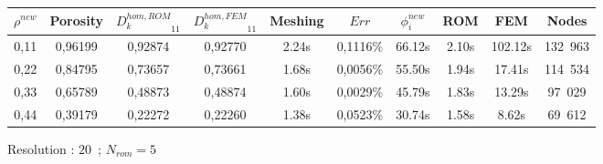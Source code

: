 {\begin{comment}
\begin{multicols}{2}
Cumulated energy :

\columnbreak
\begin{itemize}
\item $99,99\%$ : $N_{rom}=5$
\item $99,9\%$ : $N_{rom}=3$
\end{itemize}
%
\end{multicols}

\ligneinter
\end{comment}

\begin{comment}
\begin{figure}[H]%
%
\begin{center}
\begin{tabular}{|c|c||c|c||c|c||c|c||c||c|}
\hline
\rowcolor{lightgray} $\rho^{new}$&Porosity&${D_k^{hom,ROM}}_{11}$&${D_k^{hom,FEM}}_{11}$&Meshing&$Err$&$\phi_i^{new}$&ROM&FEM&Nodes\\
\hline
0,11&0,&0,&0,&,s&0,\%&s&s&s&\\
\hline
0,22&0,8479&0,&0,&s&0,\%&.s&.s&.s&16\ 458\\
\hline
0,33&0,6579&0,&0,&s&0,\%&.s&.s&.s&14\ 868\\
\hline
0,44&0,3918&0,&0,&s&0,\%&.s&.s&.s&13\ 923\\
\hline
\end{tabular}
\end{center}
\caption{Resolution : $10$\ ; $N_{rom}=5$}
%
\end{figure}
\end{comment}

\begin{figure}[H]%
%
\begin{center}
\begin{tabular}{|c|c||c|c||c|c||c|c||c||c|}
\hline
\rowcolor{lightgray} $\rho^{new}$&Porosity&${D_k^{hom,ROM}}_{11}$&${D_k^{hom,FEM}}_{11}$&Meshing&$Err$&$\phi_i^{new}$&ROM&FEM&Nodes\\
\hline
0,11&0,96199&0,92874&0,92770&2.24s&0,1116\%&66.12s&2.10s&102.12s&132\ 963\\
\hline
0,22&0,84795&0,73657&0,73661&1.68s&0,0056\%&55.50s&1.94s&17.41s&114\ 534\\
\hline
0,33&0,65789&0,48873&0,48874&1.60s&0,0029\%&45.79s&1.83s&13.29s&97\ 029\\
\hline
0,44&0,39179&0,22272&0,22260&1.38s&0,0523\%&30.74s&1.58s&8.62s&69\ 612\\
\hline
\end{tabular}
\end{center}
\caption{Resolution : $20$\ ; $N_{rom}=5$}
%
\end{figure}

}
